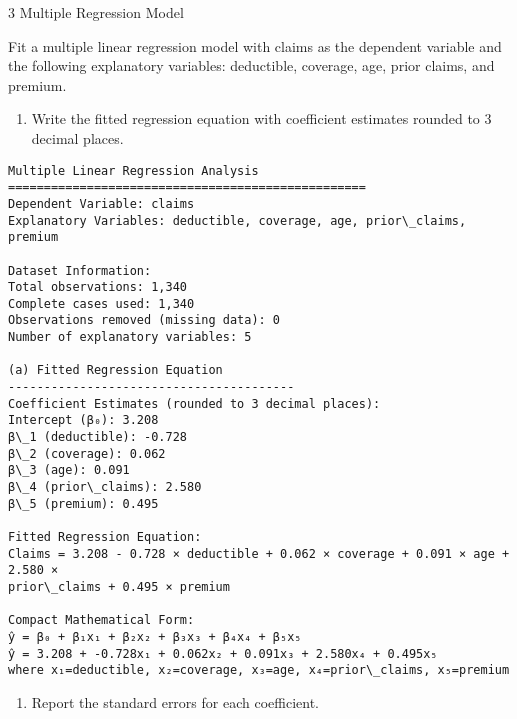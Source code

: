 \documentclass[8pt, twocolumn]{extarticle}
\providecommand{\tightlist}{%
      \setlength{\itemsep}{0pt}\setlength{\parskip}{0pt}}
\begin{document}
    3 Multiple Regression Model

Fit a multiple linear regression model with claims as the dependent
variable and the following explanatory variables: deductible, coverage,
age, prior claims, and premium.

    \begin{enumerate}
\def\labelenumi{(\alph{enumi})}
\tightlist
\item
  Write the fitted regression equation with coefficient estimates
  rounded to 3 decimal places.
\end{enumerate}

    \begin{Verbatim}[commandchars=\\\{\}]
Multiple Linear Regression Analysis
==================================================
Dependent Variable: claims
Explanatory Variables: deductible, coverage, age, prior\_claims, premium

Dataset Information:
Total observations: 1,340
Complete cases used: 1,340
Observations removed (missing data): 0
Number of explanatory variables: 5

(a) Fitted Regression Equation
----------------------------------------
Coefficient Estimates (rounded to 3 decimal places):
Intercept (β₀): 3.208
β\_1 (deductible): -0.728
β\_2 (coverage): 0.062
β\_3 (age): 0.091
β\_4 (prior\_claims): 2.580
β\_5 (premium): 0.495

Fitted Regression Equation:
Claims = 3.208 - 0.728 × deductible + 0.062 × coverage + 0.091 × age + 2.580 ×
prior\_claims + 0.495 × premium

Compact Mathematical Form:
ŷ = β₀ + β₁x₁ + β₂x₂ + β₃x₃ + β₄x₄ + β₅x₅
ŷ = 3.208 + -0.728x₁ + 0.062x₂ + 0.091x₃ + 2.580x₄ + 0.495x₅
where x₁=deductible, x₂=coverage, x₃=age, x₄=prior\_claims, x₅=premium
    \end{Verbatim}

    \begin{enumerate}
\def\labelenumi{(\alph{enumi})}
\setcounter{enumi}{1}
\tightlist
\item
  Report the standard errors for each coefficient.
\end{enumerate}
\end{document}
